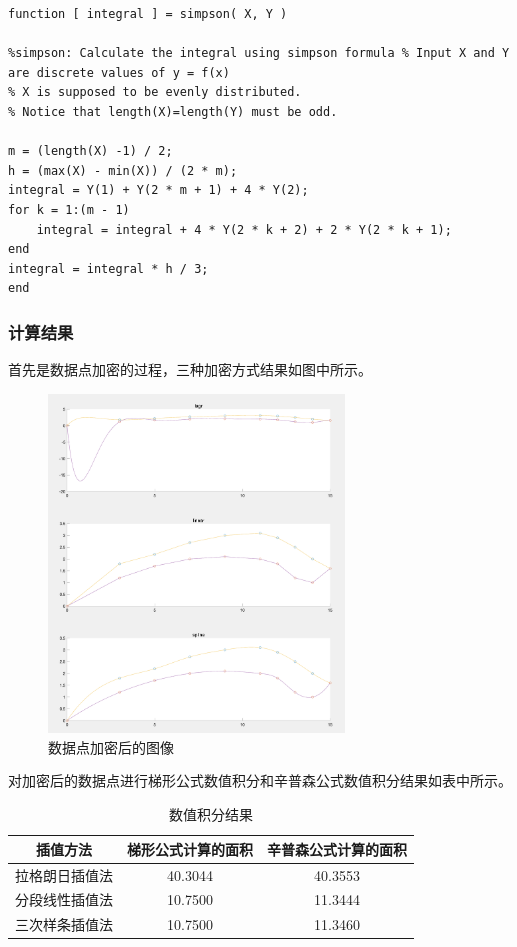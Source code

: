 \documentclass{article}
\begin{document}
\begin{lstlisting}
function [ integral ] = simpson( X, Y )

%simpson: Calculate the integral using simpson formula % Input X and Y are discrete values of y = f(x)
% X is supposed to be evenly distributed.
% Notice that length(X)=length(Y) must be odd.

m = (length(X) -1) / 2;
h = (max(X) - min(X)) / (2 * m);
integral = Y(1) + Y(2 * m + 1) + 4 * Y(2);
for k = 1:(m - 1)
    integral = integral + 4 * Y(2 * k + 2) + 2 * Y(2 * k + 1);
end
integral = integral * h / 3;
end
\end{lstlisting}

\subsubsection{计算结果}

首先是数据点加密的过程，三种加密方式结果如图中所示。

\begin{figure}[htb]
    \centering
    \includegraphics[width=0.7\textwidth]{pic1.png}
    \caption{数据点加密后的图像}
\end{figure}

对加密后的数据点进行梯形公式数值积分和辛普森公式数值积分结果如表中所示。

\begin{table}[htb]
	\centering
	\caption{数值积分结果}
	\begin{tabular}{ccc}
\hline
插值方法 & 梯形公式计算的面积 & 辛普森公式计算的面积 \\
 \hline
拉格朗日插值法 & 40.3044 & 40.3553 \\ 
分段线性插值法 & 10.7500 & 11.3444 \\
三次样条插值法 & 10.7500 & 11.3460 \\
\hline
\end{tabular}
\end{table}
\end{document}
